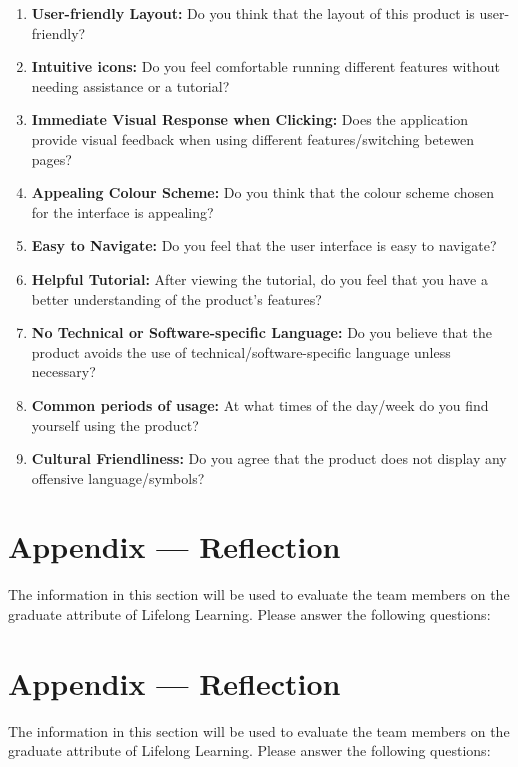 \documentclass[12pt, titlepage]{article}
\begin{document}
\begin{enumerate}
	\item \textbf{User-friendly Layout:} Do you think that the layout of this product is user-friendly?
	\item \textbf{Intuitive icons:} Do you feel comfortable running different features without needing assistance or a tutorial?
	\item \textbf{Immediate Visual Response when Clicking:} Does the application provide visual feedback when using different features/switching betewen pages?
	\item \textbf{Appealing Colour Scheme:} Do you think that the colour scheme chosen for the interface is appealing?
	\item \textbf{Easy to Navigate:} Do you feel that the user interface is easy to navigate?
	\item \textbf{Helpful Tutorial:} After viewing the tutorial, do you feel that you have a better understanding of the product's features?
	\item \textbf{No Technical or Software-specific Language:} Do you believe that the product avoids the use of technical/software-specific language unless necessary?
	\item \textbf{Common periods of usage:} At what times of the day/week do you find yourself using the product?
	\item \textbf{Cultural Friendliness:} Do you agree that the product does not display any offensive language/symbols?
\end{enumerate}

\newpage{}
\section*{Appendix --- Reflection}

The information in this section will be used to evaluate the team members on the
graduate attribute of Lifelong Learning.  Please answer the following questions:

\newpage{}
\section*{Appendix --- Reflection}


The information in this section will be used to evaluate the team members on the
graduate attribute of Lifelong Learning.  Please answer the following questions:
\end{document}
